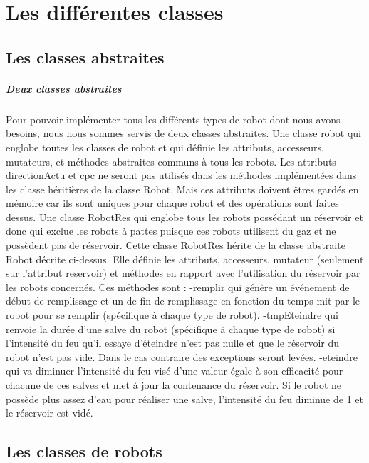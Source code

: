 \documentclass[10pt]{report}
\begin{document}
\chapter{Les différentes classes}
\section{Les classes abstraites}
\paragraph{Deux classes abstraites}Pour pouvoir implémenter tous les différents types de robot dont nous avons besoins, nous nous sommes servis de deux classes abstraites.
 Une classe robot qui englobe toutes les classes de robot et qui définie les attributs, accesseurs, mutateurs, et méthodes abstraites communs à tous les robots. Les attributs directionActu et cpc ne seront pas utilisés dans les méthodes implémentées dans les classe héritières de la classe Robot. Mais ces attributs doivent êtres gardés en mémoire car ils sont uniques pour chaque robot et des opérations sont faites dessus.
 Une classe RobotRes qui englobe tous les robots possédant un réservoir et donc qui exclue les robots à pattes puisque ces robots utilisent du gaz et ne possèdent pas de réservoir. Cette classe RobotRes hérite de la classe abstraite Robot décrite ci-dessus. Elle définie les attributs, accesseurs, mutateur (seulement sur l'attribut reservoir) et méthodes en rapport avec l'utilisation du réservoir par les robots concernés. Ces méthodes sont :
 -remplir qui génère un événement de début de remplissage et un de fin de remplissage en fonction du temps mit par le robot pour se remplir (spécifique à chaque type de robot).
 -tmpEteindre qui renvoie la durée d'une salve du robot (spécifique à chaque type de robot) si l'intensité du feu qu'il essaye d'éteindre n'est pas nulle et que le réservoir du robot n'est pas vide. Dans le cas contraire des exceptions seront levées.
 -eteindre qui va diminuer l'intensité du feu visé d'une valeur égale à son efficacité pour chacune de ces salves et met à jour la contenance du réservoir. Si le robot ne possède plus assez d'eau pour réaliser une salve, l'intensité du feu diminue de 1 et le réservoir est vidé.
\section{Les classes de robots}
\end{document}
